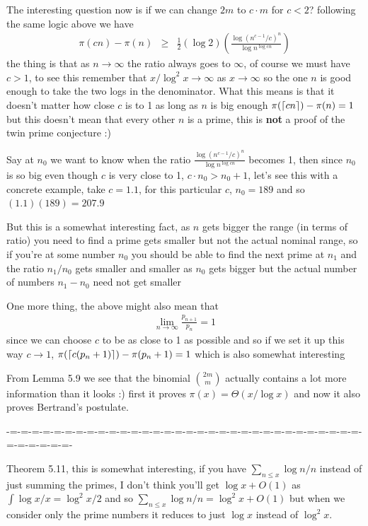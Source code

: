 \documentclass[aps,preprint,preprintnumbers,nofootinbib,showpacs,prd]{revtex4-1}
\newcommand{\nbea}{\begin{eqnarray*}}
\newcommand{\neea}{\end{eqnarray*}}
\DeclarePairedDelimiter{\ceil}{\lceil}{\rceil}
\begin{document}
The interesting question now is if we can change $2m$ to $c\cdot m$ for $c < 2$? following the same logic above we have
%
\nbea
\pi(cn) - \pi(n) & \ge & \frac{1}{2}(\log 2) \left (\frac{\log (n^{c-1}/c)^n}{ \log n^{\log cn}} \right ) 
\neea
%
the thing is that as $n\to \infty$ the ratio always goes to $\infty$, of course we must have $c > 1$, to see this remember that $x/\log^2 x \to \infty$ as $x\to \infty$ so the one $n$ is good enough to take the two logs in the denominator. What this means is that it doesn't matter how close $c$ is to 1 as long as $n$ is big enough $\pi(\ceil{cn}) - \pi(n) = 1$ but this doesn't mean that every other $n$ is a prime, this is {\bf not} a proof of the twin prime conjecture :)

Say at $n_0$ we want to know when the ratio $\frac{\log (n^{c-1}/c)^n}{ \log n^{\log cn}}$ becomes 1, then since $n_0$ is so big even though $c$ is very close to 1, $c\cdot n_0 > n_0 + 1$, let's see this with a concrete example, take $c = 1.1$, for this particular $c$, $n_0 = 189$ and so $(1.1)(189) = 207.9$

But this is a somewhat interesting fact, as $n$ gets bigger the range (in terms of ratio) you need to find a prime gets smaller but not the actual nominal range, so if you're at some number $n_0$ you should be able to find the next prime at $n_1$ and the ratio $n_1/n_0$ gets smaller and smaller as $n_0$ gets bigger but the actual number of numbers $n_1 - n_0$ need not get smaller

One more thing, the above might also mean that
%
\nbea
\lim_{n\to\infty} \frac{p_{n+1}}{p_n} = 1
\neea
%
since we can choose $c$ to be as close to 1 as possible and so if we set it up this way $c\to1$, $\pi(\ceil{c(p_n + 1)}) - \pi(p_n+1) = 1$ which is also somewhat interesting

From Lemma 5.9 we see that the binomial $\binom{2m}{m}$ actually contains a lot more information than it looks :) first it proves $\pi(x) = \Theta(x/\log x)$ and now it also proves Bertrand's postulate.

-=-=-=-=-=-=-=-=-=-=-=-=-=-=-=-=-=-=-=-=-=-=-=-=-=-=-=-=-=-=-=-=-=-=-=-=-=-=-

Theorem 5.11, this is somewhat interesting, if you have $\sum_{n \le x} \log n / n$ instead of just summing the primes, I don't think you'll get $\log x + O(1)$ as $\int \log x/x = \log^2 x/2$ and so $\sum_{n \le x} \log n / n = \log^2 x + O(1)$ but when we consider only the prime numbers it reduces to just $\log x$ instead of $\log^2 x$.
\end{document}
